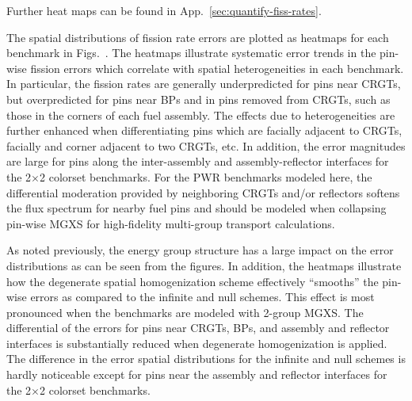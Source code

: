 Further heat maps can be found in App.~\ref{sec:quantify-fiss-rates}.

The spatial distributions of fission rate errors are plotted as heatmaps for each benchmark in Figs.~. The heatmaps illustrate systematic  error trends in the pin-wise fission errors which correlate with spatial heterogeneities in each benchmark. In particular, the fission rates are generally underpredicted for pins near \acp{CRGT}, but overpredicted for pins near \acp{BP} and in pins removed from \acp{CRGT}, such as those in the corners of each fuel assembly. The effects due to heterogeneities are further enhanced when differentiating pins which are facially adjacent to \acp{CRGT}, facially and corner adjacent to two \acp{CRGT}, etc. In addition, the error magnitudes are large for pins along the inter-assembly and assembly-reflector interfaces for the 2$\times$2 colorset benchmarks. For the \ac{PWR} benchmarks modeled here, the differential moderation provided by neighboring \acp{CRGT} and/or reflectors softens the flux spectrum for nearby fuel pins and should be modeled when collapsing pin-wise \ac{MGXS} for high-fidelity multi-group transport calculations.

As noted previously, the energy group structure has a large impact on the error distributions as can be seen from the figures. In addition, the heatmaps illustrate how the degenerate spatial homogenization scheme effectively ``smooths'' the pin-wise errors as compared to the infinite and null schemes. This effect is most pronounced when the benchmarks are modeled with 2-group \ac{MGXS}. The differential of the errors for pins near \acp{CRGT}, \acp{BP}, and assembly and reflector interfaces is substantially reduced when degenerate homogenization is applied. The difference in the error spatial distributions for the infinite and null schemes is hardly noticeable except for pins near the assembly and reflector interfaces for the 2$\times$2 colorset benchmarks.

